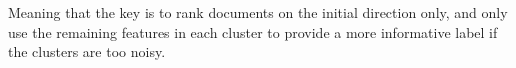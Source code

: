Meaning that the key is to rank documents on the initial direction only, and only use the remaining features in each cluster to provide a more informative label if the clusters are too noisy.









